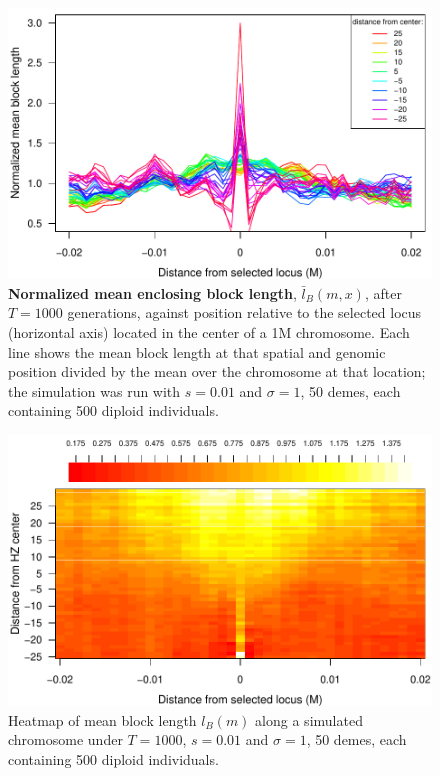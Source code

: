 \begin{figure}
\includegraphics{figs/blocksAlongChromAncBConditioning.pdf}
\caption{
    \textbf{Normalized mean enclosing block length}, $\bar l_B(m,x)$, after $T=1000$ generations,
    against position relative to the selected locus (horizontal axis)
    located in the center of a 1M chromosome.
    Each line shows the mean block length at that spatial and genomic position
    divided by the mean over the chromosome at that location;
    the simulation was run with $s=0.01$ and $\sigma=1$,
    50 demes, each containing 500 diploid individuals.
}\label{Fig:blockLengths}
\end{figure}


\begin{figure}
\includegraphics{figs/blocksAlongChromHeatmapAncBConditioning.pdf}
\caption{Heatmap of mean block length $l_B(m)$ along a simulated chromosome under $T=1000$, $s=0.01$ and $\sigma=1$,
    50 demes, each containing 500 diploid individuals. }\label{Supp:blockLengthHeatmap}
\end{figure}




